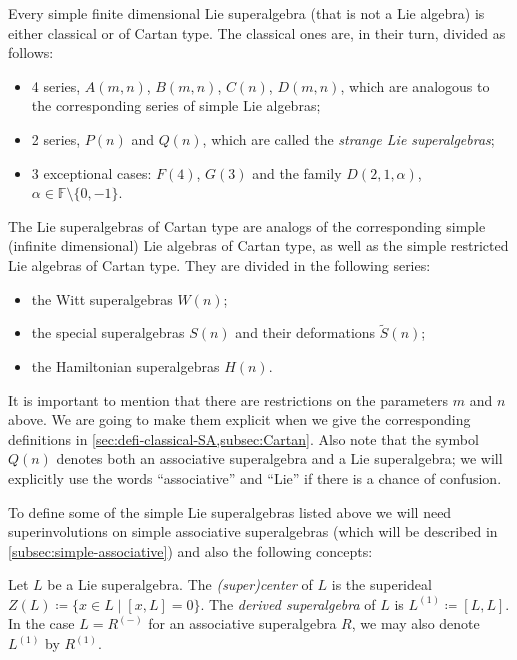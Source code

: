 Every simple finite dimensional Lie superalgebra (that is not a Lie algebra) is either classical or of Cartan type. 
The classical ones are, in their turn, divided as follows:

\begin{itemize}
	\item 4 series, $A(m,n)$, $B(m,n)$, $C(n)$, $D(m,n)$, which are analogous to the corresponding series of simple Lie algebras;

	\item 2 series, $P(n)$ and $Q(n)$, which are called the \emph{strange Lie superalgebras};

	\item 3 exceptional cases: $F(4)$, $G(3)$ and the family $D(2,1,\alpha)$, $\alpha \in \mathbb{F}\setminus \{0,-1\}$.
\end{itemize}

The Lie superalgebras of Cartan type are analogs of the corresponding simple (infinite dimensional) Lie algebras of Cartan type, as well as the simple restricted Lie algebras of Cartan type.
They are divided in the following series:

\begin{itemize}
	\item the Witt superalgebras $W(n)$;
	\item the special superalgebras $S(n)$ and their deformations $\tilde S(n)$;
	\item the Hamiltonian superalgebras $H(n)$.
\end{itemize}

It is important to mention that there are restrictions on the parameters $m$ and $n$ above. 
We are going to make them explicit when we give the corresponding definitions in \cref{sec:defi-classical-SA,subsec:Cartan}. 
Also note that the symbol $Q(n)$ denotes both an associative superalgebra and a Lie superalgebra; we will explicitly use the words ``associative'' and ``Lie'' if there is a chance of confusion. 

To define some of the simple Lie superalgebras listed above we will need superinvolutions on simple associative superalgebras (which will be described in \cref{subsec:simple-associative}) and also the following concepts:

\begin{defi}
    Let $L$ be a Lie superalgebra. 
    The \emph{(super)center} of $L$ is the superideal $Z(L) \coloneqq \{ x\in L \mid [x, L] = 0\}$. 
    The \emph{derived superalgebra} of $L$ is $L^{(1)} \coloneqq [L, L]$. 
    In the case $L = R^{(-)}$ for an associative superalgebra $R$, we may also denote $L^{(1)}$ by $R^{(1)}$. 
\end{defi}

